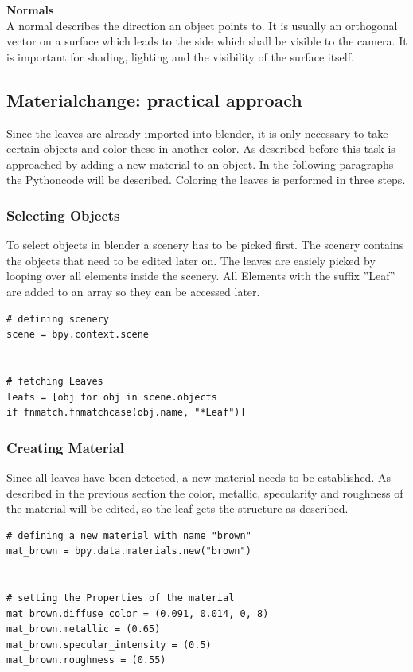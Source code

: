 \textbf{Normals} \\
A normal describes the direction an object points to. It is usually an orthogonal vector on a surface which leads to the side which shall be visible to the camera. It is important for shading, lighting  and the visibility of the surface itself.\\

\subsection{Materialchange: practical approach}


Since the leaves are already imported into blender, it is only necessary to take certain objects and color these in another color. As described before this task is approached by adding a new material to an object. In the following paragraphs the Pythoncode will be described. \newline
Coloring the leaves is performed in three steps.

\subsubsection*{Selecting Objects}
To select objects in blender a scenery has to be picked first. The scenery contains the objects that need to be edited later on. The leaves are easiely picked by looping over all elements inside the scenery. All Elements with the suffix ''Leaf'' are added to an array so they can be accessed later.
\lstset{language=Python, frame=single}
\begin{lstlisting}
# defining scenery
scene = bpy.context.scene


# fetching Leaves
leafs = [obj for obj in scene.objects
if fnmatch.fnmatchcase(obj.name, "*Leaf")]
\end{lstlisting}

\subsubsection*{Creating Material}
Since all leaves have been detected, a new material needs to be established. As described in the previous section the color, metallic, specularity and roughness of the material will be edited, so the leaf gets the structure as described.
\lstset{language=Python, frame=single}
\begin{lstlisting}
# defining a new material with name "brown"
mat_brown = bpy.data.materials.new("brown")


# setting the Properties of the material
mat_brown.diffuse_color = (0.091, 0.014, 0, 8)
mat_brown.metallic = (0.65)
mat_brown.specular_intensity = (0.5)
mat_brown.roughness = (0.55)
\end{lstlisting}

